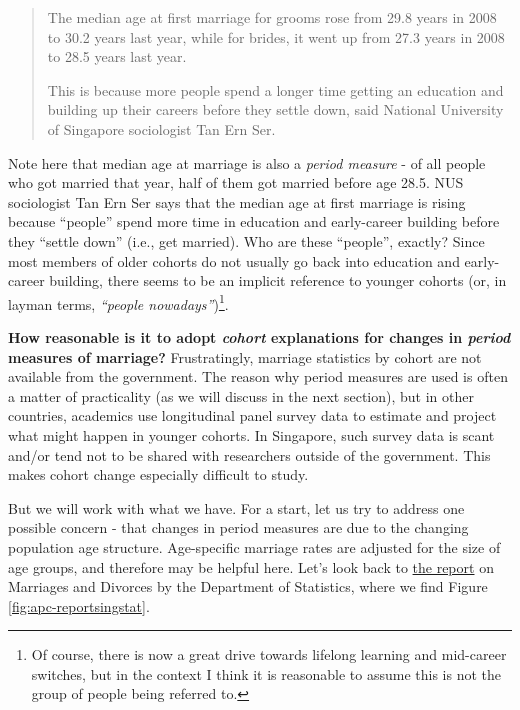 \documentclass[openany]{book}
\let\rmarkdownfootnote\footnote%
\def\footnote{\protect\rmarkdownfootnote}
\begin{document}
\begin{quote}
The median age at first marriage for grooms rose from 29.8 years in 2008
to 30.2 years last year, while for brides, it went up from 27.3 years in
2008 to 28.5 years last year.

This is because more people spend a longer time getting an education and
building up their careers before they settle down, said National
University of Singapore sociologist Tan Ern Ser.
\end{quote}

Note here that median age at marriage is also a \emph{period measure} -
of all people who got married that year, half of them got married before
age 28.5. NUS sociologist Tan Ern Ser says that the median age at first
marriage is rising because ``people'' spend more time in education and
early-career building before they ``settle down'' (i.e., get married).
Who are these ``people'', exactly? Since most members of older cohorts
do not usually go back into education and early-career building, there
seems to be an implicit reference to younger cohorts (or, in layman
terms, \emph{``people nowadays''})\footnote{Of course, there is now a
  great drive towards lifelong learning and mid-career switches, but in
  the context I think it is reasonable to assume this is not the group
  of people being referred to.}.

\textbf{How reasonable is it to adopt \emph{cohort} explanations for
changes in \emph{period} measures of marriage?} Frustratingly, marriage
statistics by cohort are not available from the government. The reason
why period measures are used is often a matter of practicality (as we
will discuss in the next section), but in other countries, academics use
longitudinal panel survey data to estimate and project what might happen
in younger cohorts. In Singapore, such survey data is scant and/or tend
not to be shared with researchers outside of the government. This makes
cohort change especially difficult to study.

But we will work with what we have. For a start, let us try to address
one possible concern - that changes in period measures are due to the
changing population age structure. Age-specific marriage rates are
adjusted for the size of age groups, and therefore may be helpful here.
Let's look back to
\href{https://www.singstat.gov.sg/-/media/files/publications/population/smd2018.pdf}{the
report} on Marriages and Divorces by the Department of Statistics, where
we find Figure \ref{fig:apc-reportsingstat}.
\end{document}
